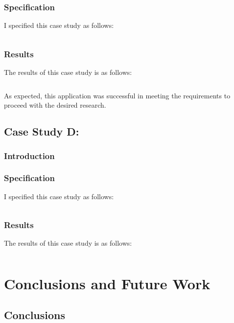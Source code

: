 \documentclass{l4proj}
\begin{document}
\subsection{Specification}
I specified this case study as follows: 
\begin{verbatim}

\end{verbatim}
\subsection{Results}
The results of this case study is as follows: 
\begin{verbatim}

\end{verbatim}
As expected, this application was successful in meeting the requirements to proceed with the desired research. 

\section{Case Study D: }
\subsection{Introduction}

\subsection{Specification}
I specified this case study as follows: 
\begin{verbatim}

\end{verbatim}
\subsection{Results}
The results of this case study is as follows: 
\begin{verbatim}

\end{verbatim}
\chapter{Conclusions and Future Work}

\section{Conclusions}
\end{document}
